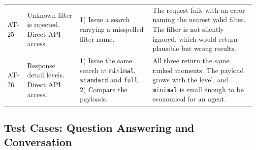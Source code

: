 \begin{table}[htbp]
\begin{tabularx}{\textwidth}{@{}L{0.9cm}L{3.2cm}XX@{}}
AT-25 & Unknown filter is rejected. Direct API access. &
1) Issue a search carrying a misspelled filter name. &
The request fails with an error naming the nearest valid filter. The filter is not
silently ignored, which would return plausible but wrong results. \\

AT-26 & Response detail levels. Direct API access. &
1) Issue the same search at \texttt{minimal}, \texttt{standard} and \texttt{full}. 2)
Compare the payloads. &
All three return the same ranked moments. The payload grows with the level, and
\texttt{minimal} is small enough to be economical for an agent. \\

\bottomrule
\end{tabularx}
\end{table}

\subsection{Test Cases: Question Answering and Conversation}

